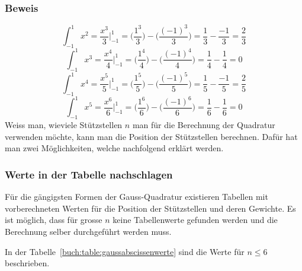 \subsubsection{Beweis}
\begin{equation}
    \int_{-1}^{1}x^{2}
    =
    \frac{x^{3}}{3} \bigg|_{-1}^{1}
    = 
    \bigg(\frac{1^{3}}{3}\bigg) - \bigg(\frac{(-1)^{3}}{3}\bigg)
    = 
    \frac{1}{3} - \frac{-1}{3}
    =
    \frac{2}{3}
\end{equation}
\begin{equation}
    \int_{-1}^{1}x^{3}
    =
    \frac{x^{4}}{4} \bigg|_{-1}^{1}
    = 
    \bigg(\frac{1^{4}}{4}\bigg) - \bigg(\frac{(-1)^{4}}{4}\bigg)
    = 
    \frac{1}{4} - \frac{1}{4}
    =
    0
\end{equation}
\begin{equation}
    \int_{-1}^{1}x^{4}
    =
    \frac{x^{5}}{5} \bigg|_{-1}^{1}
    = 
    \bigg(\frac{1^{5}}{5}\bigg) - \bigg(\frac{(-1)^{5}}{5}\bigg)
    = 
    \frac{1}{5} - \frac{-1}{5}
    =
    \frac{2}{5}
\end{equation}
\begin{equation}
    \int_{-1}^{1}x^{5}
    =
    \frac{x^{6}}{6} \bigg|_{-1}^{1}
    = 
    \bigg(\frac{1^{6}}{6}\bigg) - \bigg(\frac{(-1)^{6}}{6}\bigg)
    = 
    \frac{1}{6} - \frac{1}{6}
    =
    0
\end{equation}
\newline
\noindent
Weiss man, wieviele Stützstellen $n$ man für die Berechnung der Quadratur verwenden möchte,
kann man die Position der Stützstellen berechnen. 
Dafür hat man zwei Möglichkeiten, welche nachfolgend erklärt werden.

\newpage

\subsubsection{Werte in der Tabelle nachschlagen}
Für die gängigsten Formen der Gauss-Quadratur existieren Tabellen mit vorberechneten Werten für die
Position der Stützstellen und deren Gewichte. 
Es ist möglich, dass für grosse $n$ keine Tabellenwerte gefunden werden und die Berechnung 
selber durchgeführt werden muss.

In der Tabelle~\ref{buch:table:gaussabscissenwerte} sind die Werte für $n \leq 6$ beschrieben.

